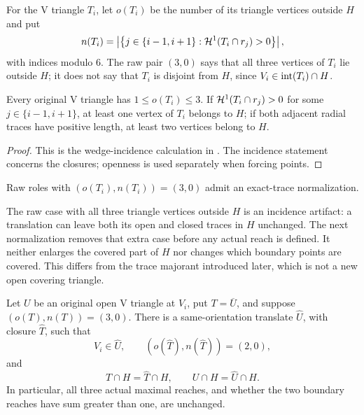 For the V triangle $T_i$, let $o(T_i)$ be the number of its triangle vertices
outside $H$ and put
\[
 n(T_i)=\left\lvert\left\{j\in\{i-1,i+1\}:
 \mathcal H^1(T_i\cap r_j)>0\right\}\right\rvert,
\]
with indices modulo $6$.  The raw pair $(3,0)$ says that all three vertices of
$T_i$ lie outside $H$; it does not say that $T_i$ is disjoint from $H$, since
$V_i\in\mathrm{int}(T_i)\cap H$.

\begin{lemma}
\label{lem:local-wedge}
Every original V triangle has $1\le o(T_i)\le3$.  If
$\mathcal H^1(T_i\cap r_j)>0$ for some $j\in\{i-1,i+1\}$, at least one vertex of
$T_i$ belongs to $H$; if both adjacent radial traces have positive length,
at least two vertices belong to $H$.
\end{lemma}

\begin{proof}
This is the wedge-incidence calculation in
.  The incidence statement concerns the closures; openness is used separately
when forcing points.
\end{proof}

Raw roles with $(o(T_i),n(T_i))=(3,0)$ admit an exact-trace normalization.

The raw case with all three triangle vertices outside $H$ is an incidence
artifact: a translation can leave both its open and closed traces in $H$
unchanged. The next normalization removes that extra case before any actual
reach is defined. It neither enlarges the covered part of $H$ nor changes
which boundary points are covered. This differs from the trace majorant
introduced later, which is not a new open covering triangle.

\begin{proposition}
\label{prop:vd0-exact-trace-normalization}
Let $U$ be an original open V triangle at $V_i$, put $T=\overline U$, and
suppose $(o(T),n(T))=(3,0)$.  There is a same-orientation translate
$\widehat U$, with closure $\widehat T$, such that
\begin{equation}
 V_i\in\widehat U,\qquad (o(\widehat T),n(\widehat T))=(2,0),
 \label{eq:o3-normalized-type}
\end{equation}
and
\begin{equation}
 T\cap H=\widehat T\cap H,\qquad
 U\cap H=\widehat U\cap H.
 \label{eq:o3-exact-traces}
\end{equation}
In particular, all three actual maximal reaches, and whether the two boundary reaches
have sum greater than one, are unchanged.
\end{proposition}

